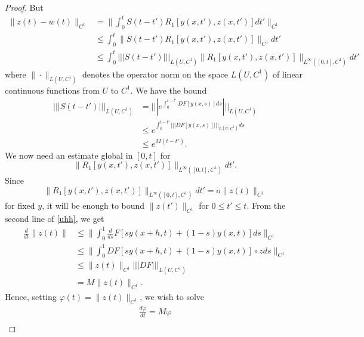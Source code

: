 \documentclass[12pt,reqno]{amsart}
\numberwithin{equation}{section}  %
\numberwithin{figure}{section}
\newcommand{\vp}{\varphi}
\theoremstyle{plain}
\theoremstyle{definition}
\theoremstyle{remark}
\begin{document}
\begin{proof}
%
%
But
%
%
\begin{equation}
  \label{yui}
\begin{split}
  \|z(t) - w(t) \|_{C^{1}}
  & = \| \int_{0}^{t} S(t-t') R_{1}\left[ y(x,t'), z(x,t')
  \right]dt' \|_{C^{1}}
  \\
  & \le \int_{0}^{t} \| S(t-t') R_{1}\left[ y(x,t'), z(x,t') \right]
  \|_{C^{1}} dt'
  \\
  & \le \int_{0}^{t}  | | | S(t-t')  | | |_{L(U, C^{1})} \| R_{1}\left[ y(x,t'),
  z(x,t')
  \right] \|_{L^{\infty}\left( [0,t], C^{1} \right)} dt'
\end{split}
\end{equation}
%
%
where $\| \cdot \|_{L(U, C^{1})}$ denotes the operator norm on the space
$L(U,C^{1})$ of linear continuous functions from $U$ to $C^{1}$. We have the bound
%
%
\begin{equation}
  \label{op-norm}
\begin{split}
  | | | S(t-t') | | |_{L(U, C^{1})} 
  & = | | | e^{\int_{0}^{t-t'} DF \left[ y(x,s)
  \right] ds} | | |_{L(U, C^{1})}
  \\\
  & \le e^{\int_{0}^{t-t'} | | | DF\left[ y(x,s) \right]| | |_{L(U, C^{1})}ds} 
  \\
  & \le e^{M(t-t')}.
\end{split}
\end{equation}
%
%
We now need an estimate global in $[0,t]$ for
$$ \| R_{1}\left[ y(x,t'), z(x,t')
\right] \|_{L^{\infty}\left( [0,t], C^{1} \right)} dt'.$$ Since 
$$ \| R_{1}\left[ y(x,t'), z(x,t')
\right] \|_{L^{\infty}\left( [0,t], C^{1} \right)} dt' = o\| z(t)
\|_{C^{1}}$$ for fixed
$y$, it will be enough to bound $\| z(t') \|_{C^{1}}$ for $0 \le t' \le t$. From the
second line of \eqref{uhh}, we get
%
%
\begin{equation*}
\begin{split}
\frac{d}{dt} \| z(t) \|
& \le \| \int_{0}^{1} \frac{d}{ds} F\left[ sy(x+h, t) + (1-s)y(x,t) \right]ds
\|_{C^{1}}
\\
& \le \| \int_{0}^{1} DF\left[  sy(x+h, t) + (1-s)y(x,t) \right] \circ z ds
\|_{C^{1}}
\\
& \le \| z(t) \|_{C^{1}} | | | DF | | |_{L(U, C^{1})}
\\
& = M \| z(t) \|_{C^{1}}.
\end{split}
\end{equation*}
%
%
Hence, setting $\vp(t) =  \| z(t) \|_{C^{1}}$, we wish to solve
%
%
\begin{gather*}
\frac{d \vp}{dt} = M \vp
\\

\end{gather*}
\end{proof}
\end{document}
